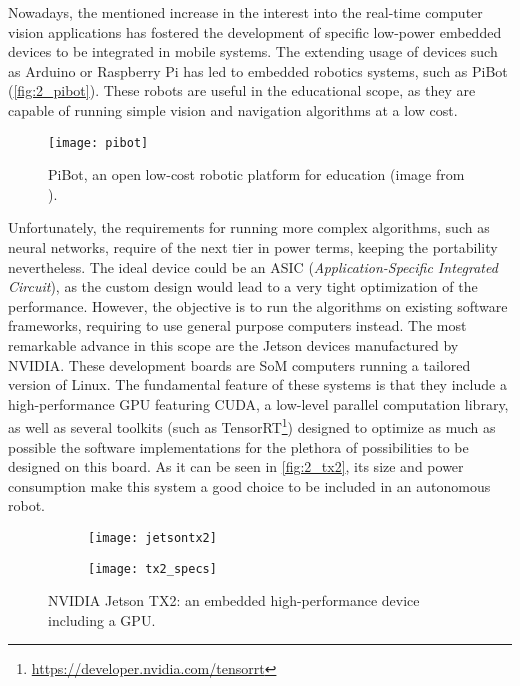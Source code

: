 Nowadays, the mentioned increase in the interest into the real-time computer vision applications has fostered the development of specific low-power embedded devices to be integrated in mobile systems. The extending usage of devices such as Arduino or Raspberry Pi has led to embedded robotics systems, such as PiBot \cite{pibot} (\autoref{fig:2_pibot}). These robots are useful in the educational scope, as they are capable of running simple vision and navigation algorithms at a low cost.\\
\begin{figure}[h]
	\centering
	\texttt{[image: pibot]}
	\caption{PiBot, an open low-cost robotic platform for education (image from \cite{pibot}).}
	\label{fig:2_pibot}
\end{figure}
Unfortunately, the requirements for running more complex algorithms, such as neural networks, require of the next tier in power terms, keeping the portability nevertheless. The ideal device could be an ASIC (\textit{Application-Specific Integrated Circuit}), as the custom design would lead to a very tight optimization of the performance. However, the objective is to run the algorithms on existing software frameworks, requiring to use general purpose computers instead. The most remarkable advance in this scope are the Jetson devices manufactured by NVIDIA. These development boards are SoM computers running a tailored version of Linux. The fundamental feature of these systems is that they include a high-performance GPU featuring CUDA, a low-level parallel computation library, as well as several toolkits (such as TensorRT\footnote{\url{https://developer.nvidia.com/tensorrt}}) designed to optimize as much as possible the software implementations for the plethora of possibilities to be designed on this board. As it can be seen in \autoref{fig:2_tx2}, its size and power consumption make this system a good choice to be included in an autonomous robot. 
\begin{figure}[h!]
	\begin{subfigure}[h]{0.45\linewidth}
		\centering
		\texttt{[image: jetsontx2]}

	\end{subfigure}
	\begin{subfigure}[h]{0.45\linewidth}
		\centering
		\texttt{[image: tx2\_specs]}
	\end{subfigure}
	\caption{NVIDIA Jetson TX2: an embedded high-performance device including a GPU.}
	\label{fig:2_tx2}
\end{figure}



